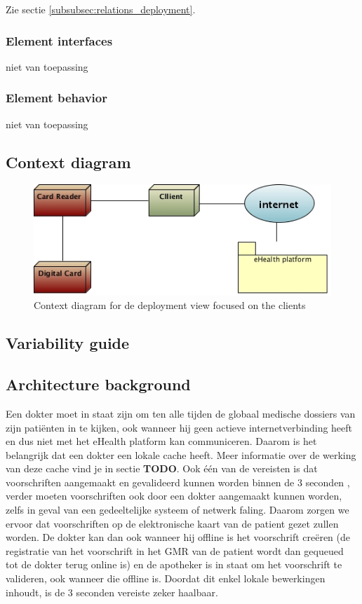\documentclass[a4paper,10pt]{article}
\begin{document}
Zie sectie \ref{subsubsec:relations_deployment}.

\subsubsection{Element interfaces}

niet van toepassing

\subsubsection{Element behavior}

niet van toepassing

\subsection{Context diagram}

\begin{figure}[!h]
  \includegraphics[width=\textwidth]{../images/deployment_clients_context.jpg}
    \caption{Context diagram for de deployment view focused on the clients}
\end{figure}

\subsection{Variability guide}

\subsection{Architecture background}
Een dokter moet in staat zijn om ten alle tijden de globaal medische dossiers van zijn patiënten in te kijken, ook wanneer hij geen actieve internetverbinding heeft en dus niet met het eHealth platform kan communiceren. Daarom is het belangrijk dat een dokter een lokale cache heeft. Meer informatie over de werking van deze cache vind je in sectie \textbf{TODO}.
Ook één van de vereisten is dat voorschriften aangemaakt en gevalideerd kunnen worden binnen de 3 seconden , verder moeten voorschriften ook door een dokter aangemaakt kunnen worden, zelfs in geval van een gedeeltelijke systeem of netwerk faling. Daarom zorgen we ervoor dat voorschriften op de elektronische kaart van de patient gezet zullen worden. De dokter kan dan ook wanneer hij offline is het voorschrift creëren (de registratie van het voorschrift in het GMR van de patient wordt dan gequeued tot de dokter terug online is) en de apotheker is in staat om het voorschrift te valideren, ook wanneer die offline is. Doordat dit enkel lokale bewerkingen inhoudt, is de 3 seconden vereiste zeker haalbaar.
\end{document}
